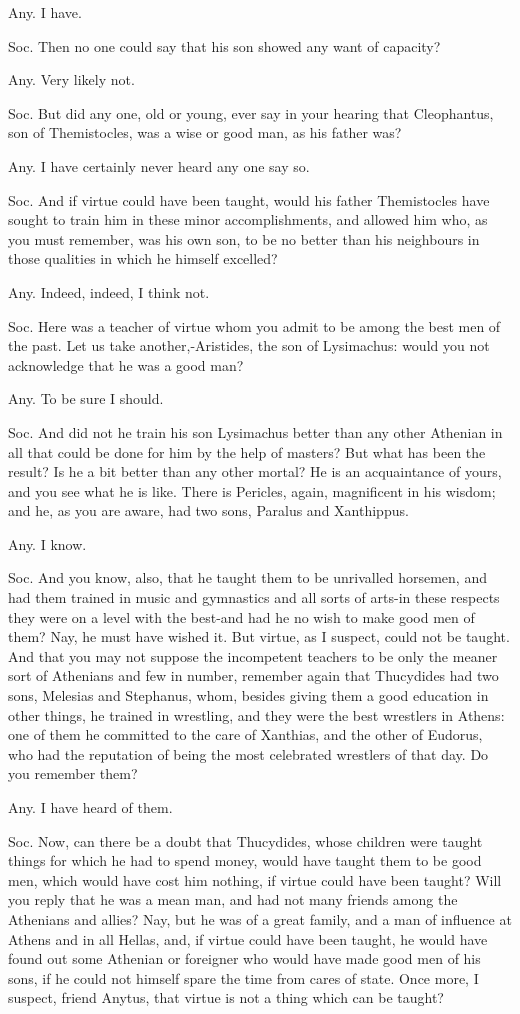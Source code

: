 Any. I have. 

Soc. Then no one could say that his son showed any want of capacity?

Any. Very likely not. 

Soc. But did any one, old or young, ever say in your hearing that
Cleophantus, son of Themistocles, was a wise or good man, as his father
was? 

Any. I have certainly never heard any one say so. 

Soc. And if virtue could have been taught, would his father Themistocles
have sought to train him in these minor accomplishments, and allowed
him who, as you must remember, was his own son, to be no better than
his neighbours in those qualities in which he himself excelled?

Any. Indeed, indeed, I think not. 

Soc. Here was a teacher of virtue whom you admit to be among the best
men of the past. Let us take another,-Aristides, the son of Lysimachus:
would you not acknowledge that he was a good man? 

Any. To be sure I should. 

Soc. And did not he train his son Lysimachus better than any other
Athenian in all that could be done for him by the help of masters?
But what has been the result? Is he a bit better than any other mortal?
He is an acquaintance of yours, and you see what he is like. There
is Pericles, again, magnificent in his wisdom; and he, as you are
aware, had two sons, Paralus and Xanthippus. 

Any. I know. 

Soc. And you know, also, that he taught them to be unrivalled horsemen,
and had them trained in music and gymnastics and all sorts of arts-in
these respects they were on a level with the best-and had he no wish
to make good men of them? Nay, he must have wished it. But virtue,
as I suspect, could not be taught. And that you may not suppose the
incompetent teachers to be only the meaner sort of Athenians and few
in number, remember again that Thucydides had two sons, Melesias and
Stephanus, whom, besides giving them a good education in other things,
he trained in wrestling, and they were the best wrestlers in Athens:
one of them he committed to the care of Xanthias, and the other of
Eudorus, who had the reputation of being the most celebrated wrestlers
of that day. Do you remember them? 

Any. I have heard of them. 

Soc. Now, can there be a doubt that Thucydides, whose children were
taught things for which he had to spend money, would have taught them
to be good men, which would have cost him nothing, if virtue could
have been taught? Will you reply that he was a mean man, and had not
many friends among the Athenians and allies? Nay, but he was of a
great family, and a man of influence at Athens and in all Hellas,
and, if virtue could have been taught, he would have found out some
Athenian or foreigner who would have made good men of his sons, if
he could not himself spare the time from cares of state. Once more,
I suspect, friend Anytus, that virtue is not a thing which can be
taught? 

